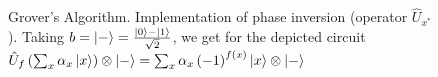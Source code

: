 \begin{figure}
\centering



\caption{Grover's Algorithm. Implementation of phase inversion (operator
  $\hat{U}_{x^\ast}$). Taking 
  $b=\ket{-} = \frac{\ket{0} -
    \ket{1}}{\sqrt{2}}$, we get for the depicted circuit
$\hat{U}_{f}\left(\sum_x \alpha_x \ket{x}\right)\otimes\ket{-} = 
\sum_x \alpha_x
\left(-1\right)^{f\left(x\right)}\ket{x}\otimes\ket{-}$} 
\label{figQuantCompGroverPhaseInvImpl}
\end{figure}